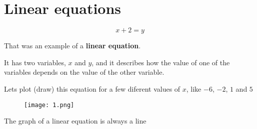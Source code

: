 \documentclass{article}
\begin{document}
\section{Linear equations}

\[
x + 2 = y 
\]


That was an example of a \textbf{linear equation}. 

It has two variables, $x$ and $y$, and it describes how the value of one of the variables depends on the value of the other variable.

Lets plot (draw) this equation for a few diferent values of $x$, like $-6$, $-2$, $1$ and $5$



\begin{figure}[h]
\centering
\texttt{[image: 1.png]}
\end{figure}

The graph of a linear equation is always a line 
\end{document}
